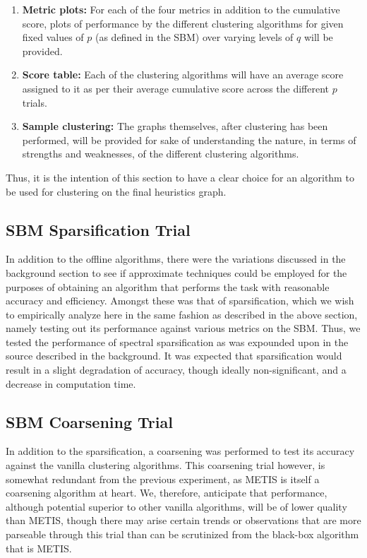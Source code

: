 \documentclass{article}
\begin{document}
\begin{enumerate}
    \item \textbf{Metric plots:} For each of the four metrics in addition to the cumulative score, plots of performance by the different clustering algorithms for given fixed values of $p$ (as defined in the SBM) over varying levels of $q$ will be provided. 
    \item \textbf{Score table:} Each of the clustering algorithms will have an average score assigned to it as per their average cumulative score across the different $p$ trials.
    \item \textbf{Sample clustering:} The graphs themselves, after clustering has been performed, will be provided for sake of understanding the nature, in terms of strengths and weaknesses, of the different clustering algorithms.
\end{enumerate}

Thus, it is the intention of this section to have a clear choice for an algorithm to be used for clustering on the final heuristics graph.

\subsection{SBM Sparsification Trial}
In addition to the offline algorithms, there were the variations discussed in the background section to see if approximate techniques could be employed for the purposes of obtaining an algorithm that performs the task with reasonable accuracy and efficiency. Amongst these was that of sparsification, which we wish to empirically analyze here in the same fashion as described in the above section, namely testing out its performance against various metrics on the SBM. Thus, we tested the performance of spectral sparsification as was expounded upon in the source described in the background. It was expected that sparsification would result in a slight degradation of accuracy, though ideally non-significant, and a decrease in computation time.

\subsection{SBM Coarsening Trial}
In addition to the sparsification, a coarsening was performed to test its accuracy against the vanilla clustering algorithms. This coarsening trial however, is somewhat redundant from the previous experiment, as METIS is itself a coarsening algorithm at heart. We, therefore, anticipate that performance, although potential superior to other vanilla algorithms, will be of lower quality than METIS, though there may arise certain trends or observations that are more parseable through this trial than can be scrutinized from the black-box algorithm that is METIS.
\end{document}
